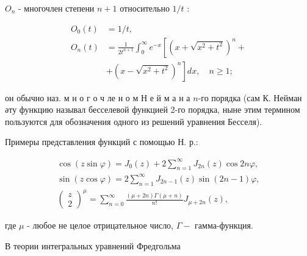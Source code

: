 \documentclass[10pt]{article}
\begin{document}
$O_{n}$ - многочлен степени $n+1$ относительно $1 / t$ :



\[

\begin{aligned}

O_{0}(t) & =1 / t, \\

O_{n}(t) & =\frac{1}{2 t^{n+1}} \int_{0}^{\infty} e^{-x}\left[\left(x+\sqrt{x^{2}+t^{2}}\right)^{n}+\right. \\

& \left.+\left(x-\sqrt{x^{2}+t^{2}}\right)^{n}\right] d x, \quad n \geqslant 1 ;

\end{aligned}

\]



он обычно наз. м н о г о ч ле н о м Н е й м а н а $n$-го порядка (сам К. Нейман әту функцию называл бесселевой функцией 2-го порядка, ныне этим термином пользуются для обозначения одного из решений уравнения Бесселя).



Примеры представления функций с помощью Н. р.:



\[

\begin{gathered}

\cos (z \sin \varphi)=J_{0}(z)+2 \sum_{n=1}^{\infty} J_{2 n}(z) \cos 2 n \varphi, \\

\sin (z \cos \varphi)=2 \sum_{n=1}^{\infty} J_{2 n-1}(z) \sin (2 n-1) \varphi, \\

\left(\begin{array}{c}

z \\

2

\end{array}\right)^{\mu}=\sum_{n=0}^{\infty} \frac{(\mu+2 n) \Gamma(\mu+n)}{n !} J_{\mu+2 n}(z),

\end{gathered}

\]



где $\mu$ - любое не целое отрицательное число, $\Gamma-$ гамма-функция.



В теории интегральных уравнений Фредгольма
\end{document}
